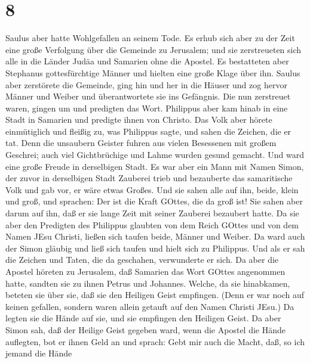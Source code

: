 \hypertarget{section-7}{%
\section{8}\label{section-7}}

 Saulus aber hatte Wohlgefallen an seinem Tode. Es erhub
sich aber zu der Zeit eine große Verfolgung über die Gemeinde zu
Jerusalem; und sie zerstreueten sich alle in die Länder Judäa und
Samarien ohne die Apostel.  Es bestatteten aber Stephanus
gottesfürchtige Männer und hielten eine große Klage über ihn.
 Saulus aber zerstörete die Gemeinde, ging hin und her in
die Häuser und zog hervor Männer und Weiber und überantwortete sie ins
Gefängnis.  Die nun zerstreuet waren, gingen um und
predigten das Wort.  Philippus aber kam hinab in eine Stadt
in Samarien und predigte ihnen von Christo.  Das Volk aber
hörete einmütiglich und fleißig zu, was Philippus sagte, und sahen die
Zeichen, die er tat.  Denn die unsaubern Geister fuhren aus
vielen Besessenen mit großem Geschrei; auch viel Gichtbrüchige und Lahme
wurden gesund gemacht.  Und ward eine große Freude in
derselbigen Stadt.  Es war aber ein Mann mit Namen Simon,
der zuvor in derselbigen Stadt Zauberei trieb und bezauberte das
samaritische Volk und gab vor, er wäre etwas Großes.  Und
sie sahen alle auf ihn, beide, klein und groß, und sprachen: Der ist die
Kraft GOttes, die da groß ist!  Sie sahen aber darum auf
ihn, daß er sie lange Zeit mit seiner Zauberei bezaubert hatte.
 Da sie aber den Predigten des Philippus glaubten von dem
Reich GOttes und von dem Namen JEsu Christi, ließen sich taufen beide,
Männer und Weiber.  Da ward auch der Simon gläubig und ließ
sich taufen und hielt sich zu Philippus. Und als er sah die Zeichen und
Taten, die da geschahen, verwunderte er sich.  Da aber die
Apostel höreten zu Jerusalem, daß Samarien das Wort GOttes angenommen
hatte, sandten sie zu ihnen Petrus und Johannes.  Welche,
da sie hinabkamen, beteten sie über sie, daß sie den Heiligen Geist
empfingen.  (Denn er war noch auf keinen gefallen, sondern
waren allein getauft auf den Namen Christi JEsu.)  Da
legten sie die Hände auf sie, und sie empfingen den Heiligen Geist.
 Da aber Simon sah, daß der Heilige Geist gegeben ward,
wenn die Apostel die Hände auflegten, bot er ihnen Geld an 
und sprach: Gebt mir auch die Macht, daß, so ich jemand die Hände
